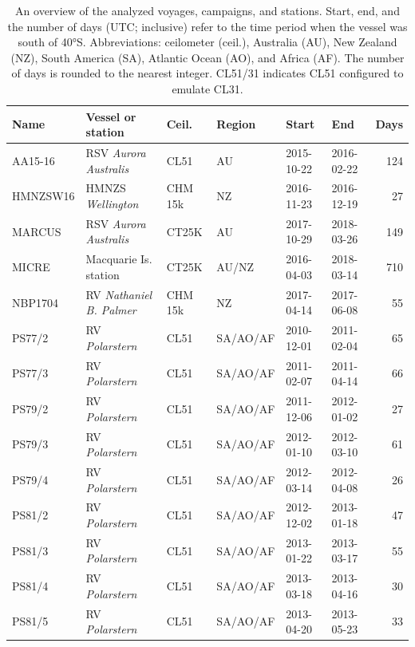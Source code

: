 \documentclass[draft]{agujournal2019}
\begin{document}
\begin{table}[p!]
\caption{
An overview of the analyzed voyages, campaigns, and stations. Start, end, and the number of days (UTC; inclusive) refer to the time period when the vessel was south of 40°S. Abbreviations: ceilometer (ceil.), Australia (AU), New Zealand (NZ), South America (SA), Atlantic Ocean (AO), and Africa (AF). The number of days is rounded to the nearest integer. CL51/31 indicates CL51 configured to emulate CL31.
}
\label{tab:voyages}
\centering
\small
\begin{tabular}{llllllr}
\textbf{Name} & \textbf{Vessel or station} & \textbf{Ceil.} & \textbf{Region} & \textbf{Start} & \textbf{End} & \textbf{Days}\\
\hline
AA15-16  & RSV \emph{Aurora Australis}   & CL51    & AU       & 2015-10-22 & 2016-02-22 & 124 \\
HMNZSW16 & HMNZS \emph{Wellington}       & CHM 15k & NZ       & 2016-11-23 & 2016-12-19 & 27 \\
MARCUS   & RSV \emph{Aurora Australis}   & CT25K   & AU       & 2017-10-29 & 2018-03-26 & 149 \\
MICRE    & Macquarie Is. station         & CT25K   & AU/NZ    & 2016-04-03 & 2018-03-14 & 710 \\
NBP1704  & RV \emph{Nathaniel B. Palmer} & CHM 15k & NZ       & 2017-04-14 & 2017-06-08 & 55 \\
PS77/2   & RV \emph{Polarstern}          & CL51    & SA/AO/AF & 2010-12-01 & 2011-02-04 & 65 \\
PS77/3   & RV \emph{Polarstern}          & CL51    & SA/AO/AF & 2011-02-07 & 2011-04-14 & 66 \\
PS79/2   & RV \emph{Polarstern}          & CL51    & SA/AO/AF & 2011-12-06 & 2012-01-02 & 27 \\
PS79/3   & RV \emph{Polarstern}          & CL51    & SA/AO/AF & 2012-01-10 & 2012-03-10 & 61 \\
PS79/4   & RV \emph{Polarstern}          & CL51    & SA/AO/AF & 2012-03-14 & 2012-04-08 & 26 \\
PS81/2   & RV \emph{Polarstern}          & CL51    & SA/AO/AF & 2012-12-02 & 2013-01-18 & 47 \\
PS81/3   & RV \emph{Polarstern}          & CL51    & SA/AO/AF & 2013-01-22 & 2013-03-17 & 55 \\
PS81/4   & RV \emph{Polarstern}          & CL51    & SA/AO/AF & 2013-03-18 & 2013-04-16 & 30 \\
PS81/5   & RV \emph{Polarstern}          & CL51    & SA/AO/AF & 2013-04-20 & 2013-05-23 & 33 \\

\end{tabular}
\end{table}
\end{document}
